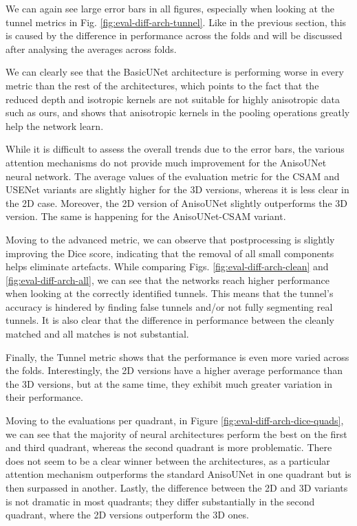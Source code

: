 \documentclass[
  digital,     %
  oneside,     %
  nosansbold,  %
  nocolorbold, %
  lof,         %
  lot,         %
]{fithesis4}
\begin{document}
We can again see large error bars in all figures, especially when looking at the tunnel metrics in Fig. \ref{fig:eval-diff-arch-tunnel}. Like in the previous section, this is caused by the difference in performance across the folds and will be discussed after analysing the averages across folds.

We can clearly see that the BasicUNet architecture is performing worse in every metric than the rest of the architectures, which points to the fact that the reduced depth and isotropic kernels are not suitable for highly anisotropic data such as ours, and shows that anisotropic kernels in the pooling operations greatly help the network learn.

While it is difficult to assess the overall trends due to the error bars, the various attention mechanisms do not provide much improvement for the AnisoUNet neural network. The average values of the evaluation metric for the CSAM and USENet variants are slightly higher for the 3D versions, whereas it is less clear in the 2D case. Moreover, the 2D version of AnisoUNet slightly outperforms the 3D version. The same is happening for the AnisoUNet-CSAM variant.

Moving to the advanced metric, we can observe that postprocessing is slightly improving the Dice score, indicating that the removal of all small components helps eliminate artefacts. While comparing Figs. \ref{fig:eval-diff-arch-clean} and \ref{fig:eval-diff-arch-all}, we can see that the networks reach higher performance when looking at the correctly identified tunnels. This means that the tunnel's accuracy is hindered by finding false tunnels and/or not fully segmenting real tunnels. It is also clear that the difference in performance between the cleanly matched and all matches is not substantial.

Finally, the Tunnel metric shows that the performance is even more varied across the folds. Interestingly, the 2D versions have a higher average performance than the 3D versions, but at the same time, they exhibit much greater variation in their performance.

Moving to the evaluations per quadrant, in Figure \ref{fig:eval-diff-arch-dice-quads}, we can see that the majority of neural architectures perform the best on the first and third quadrant, whereas the second quadrant is more problematic. There does not seem to be a clear winner between the architectures, as a particular attention mechanism outperforms the standard AnisoUNet in one quadrant but is then surpassed in another. Lastly, the difference between the 2D and 3D variants is not dramatic in most quadrants; they differ substantially in the second quadrant, where the 2D versions outperform the 3D ones.
\end{document}
